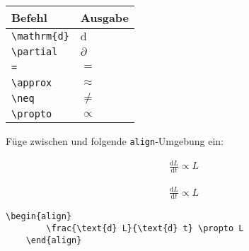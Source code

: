 \begin{frame}[fragile]
	\begin{center}
		\begin{tabular}{ll}
			\toprule
			Befehl							&	Ausgabe					\\ \midrule
			\lstinline|\mathrm{d}|		&	$\mathrm{d}$		\\
			\lstinline|\partial|		&	$\partial$		
			\\
			\lstinline|=|		&	$=$		
      \\
			\lstinline|\approx|		&	$\approx$		
			\\
			\lstinline|\neq|					&	$\neq$		\\
      \lstinline|\propto|					&	$\propto$		\\
			\bottomrule
		\end{tabular}
	\end{center}
	\pause\btVFill
	\Aufgabee
	Füge zwischen  und  folgende \lstinline[basicstyle=\normalfont\normalsize]|align|-Umgebung ein:
	\begin{outputbox}
	    \begin{align}
	        \frac{\text{d} L}{\text{d} t} \propto L 
	    \end{align}	
    \end{outputbox}
	\vspace{0.3cm}
\end{frame}
\begin{frame}[fragile]
	\Losung
	\begin{outputbox}
    \begin{align}
      \frac{\text{d} L}{\text{d} t} \propto L 
    \end{align}
	\end{outputbox}

	\Code
	\begin{lstlisting}[gobble=4]
    \begin{align}
        \frac{\text{d} L}{\text{d} t} \propto L 
    \end{align}
	\end{lstlisting}
\end{frame}
